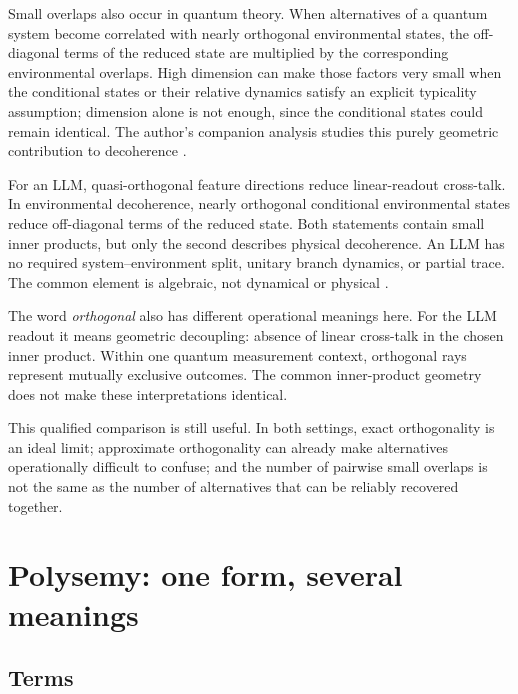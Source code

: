 \documentclass[
  aps,
  reprint,
  superscriptaddress,
  floatfix,
  nofootinbib,
  longbibliography
]{revtex4-2}
\begin{document}
Small overlaps also occur in quantum theory.  When alternatives of a quantum
system become correlated with nearly orthogonal environmental states, the
off-diagonal terms of the reduced state are multiplied by the corresponding
environmental overlaps.  High dimension can make those factors very small
when the conditional states or their relative dynamics satisfy an explicit
typicality assumption; dimension alone is not enough, since the conditional
states could remain identical.  The author's companion analysis studies this
purely geometric contribution to decoherence
\cite{svozil2026geometricdecoherence}.

For an LLM, quasi-orthogonal feature directions reduce linear-readout
cross-talk.  In environmental decoherence, nearly orthogonal conditional
environmental states reduce off-diagonal terms of the reduced state.  Both
statements contain small inner products, but only the second describes
physical decoherence.  An LLM has no required system--environment split,
unitary branch dynamics, or partial trace.  The common element is algebraic,
not dynamical or physical \cite{RevModPhys.75.715}.

The word \emph{orthogonal} also has different operational meanings here.  For
the LLM readout it means geometric decoupling: absence of linear cross-talk in
the chosen inner product.  Within one quantum measurement
context, orthogonal rays represent
mutually exclusive outcomes.  The common inner-product geometry does not make
these interpretations identical.

This qualified comparison is still useful.  In both settings, exact
orthogonality is an ideal limit; approximate orthogonality can already make
alternatives operationally difficult to confuse; and the number of pairwise
small overlaps is not the same as the number of alternatives that can be
reliably recovered together.



\section{Polysemy: one form, several meanings}
\label{sec:polysemy}

\subsection{Terms}
\end{document}
